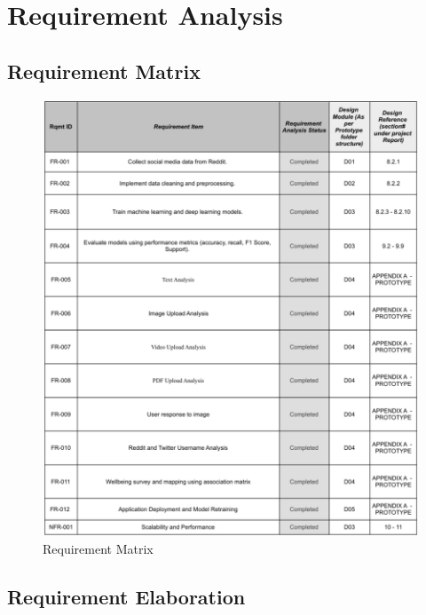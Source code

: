 \pagebreak

\section{Requirement Analysis}

\subsection{Requirement Matrix}
\begin{figure}[H]  
    \centering
    \includegraphics[width=1.0\textwidth]{Images/Requirement Matrix.png}  
    \caption{Requirement Matrix}
    \label{Requirement Matrix}  %
\end{figure}

\pagebreak

\subsection{Requirement Elaboration}

